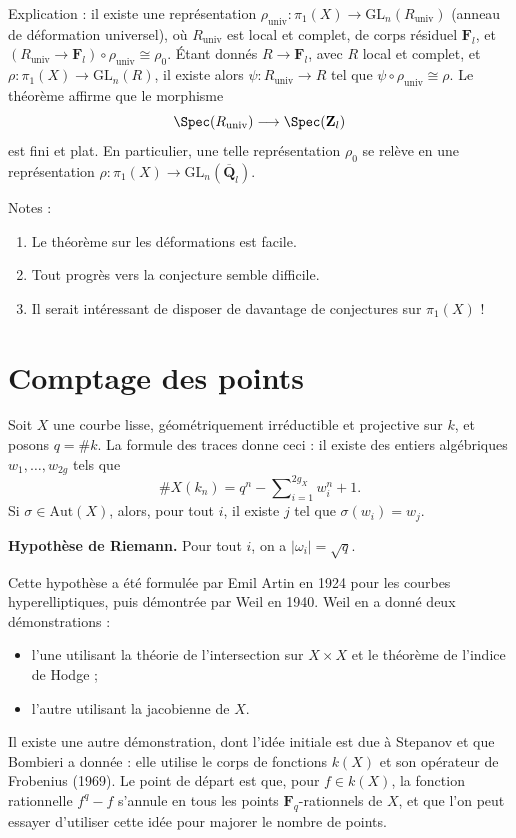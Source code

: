 \noindent
Explication : il existe une représentation $\rho_{\text{univ}}:
\pi_1(X)\to \text{GL}_n(R_{\text{univ}})$ (anneau de déformation universel),
où $R_{\text{univ}}$ est local et
complet, de corps résiduel $\mathbf{F}_l$, et $(R_{\text{univ}}\to
\mathbf{F}_l)\circ\rho_{\text{univ}}\cong\rho_0$.
Étant donnés $R\to \mathbf{F}_l$, avec $R$ local et complet, et
$\rho : \pi_1(X)\to \text{GL}_n(R)$, il existe alors
$\psi : R_{\text{univ}}\to R$ tel que
$\psi\circ\rho_{\text{univ}}\cong \rho$. Le théorème affirme que le morphisme
$$
\Spec(R_{\text{univ}})
\longrightarrow
\Spec(\mathbf{Z}_l)
$$
est fini et plat. En particulier, une telle représentation $\rho_0$
se relève en une représentation $\rho : \pi_1(X) \to \text{GL}_n(\overline{\mathbf{Q}}_l)$.

\medskip\noindent
Notes :
\begin{enumerate}
\item Le théorème sur les déformations est facile.
\item Tout progrès vers la conjecture semble difficile.
\item Il serait intéressant de disposer de davantage de conjectures sur $\pi_1(X)$ !
\end{enumerate}




\section{Comptage des points}
\label{section-counting}

\noindent
Soit $X$ une courbe lisse, géométriquement irréductible et
projective sur $k$, et posons $q = \# k$. La formule des traces donne ceci :
il existe des entiers algébriques $w_1, \ldots, w_{2g}$ tels que
$$
\# X(k_n) = q^n - \sum\nolimits_{i = 1}^{2g_X} w_i^n + 1.
$$
Si $\sigma\in \text{Aut}(X)$, alors, pour tout $i$, il existe $j$ tel que
$\sigma(w_i)=w_j$.

\medskip\noindent
{\bf Hypothèse de Riemann.} Pour tout $i$, on a $|\omega_i| = \sqrt{q}$.

\medskip\noindent
Cette hypothèse a été formulée par Emil Artin en 1924 pour les
courbes hyperelliptiques, puis démontrée par Weil en 1940. Weil en a donné deux démonstrations :
\begin{itemize}
\item l'une utilisant la théorie de l'intersection sur $X \times X$ et le
théorème de l'indice de Hodge ;
\item l'autre utilisant la jacobienne de $X$.
\end{itemize}
Il existe une autre démonstration, dont l'idée initiale est due à Stepanov et
que Bombieri a donnée : elle utilise le corps de fonctions $k(X)$ et
son opérateur de Frobenius (1969). Le point de départ est que, pour
$f\in k(X)$, la fonction rationnelle $f^q - f$
s'annule en tous les points $\mathbf{F}_q$-rationnels de $X$, et que l'on
peut essayer d'utiliser cette idée pour majorer le nombre de points.


